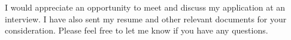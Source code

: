 \documentclass[11pt]{moderncv}        %
\begin{document}

I would appreciate an opportunity to meet and discuss my application at an
interview. I have also sent my resume and other relevant documents for your
consideration. Please feel free to let me know if you have any questions.

\makeletterclosing
\end{document}
